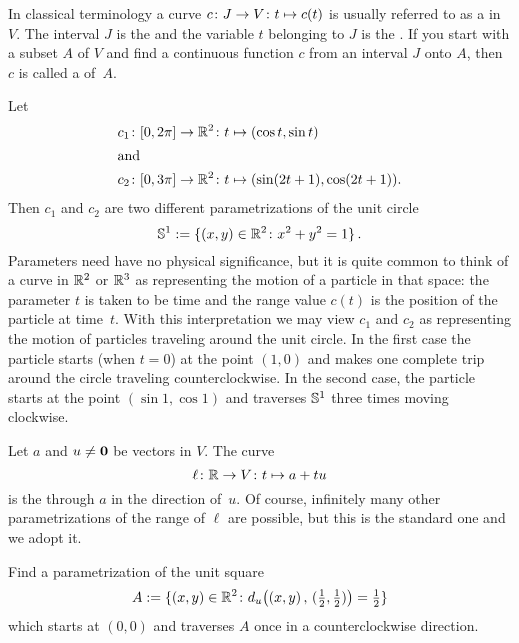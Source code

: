 In classical terminology a curve $c \colon J \rightarrow V \colon t \mapsto c(t)$ is usually referred
to as a
 in~$V$.  The interval $J$ is the
 and the variable $t$ belonging to $J$ is the
.  If you start with a subset $A$ of $V$ and find a continuous function $c$ from
an interval $J$ onto $A$, then $c$ is called a
 of~$A$.

\begin{exam}  Let
 \begin{align*}
      c_1 &\colon [0,2\pi] \rightarrow \mathbb{R}^2 \colon t \mapsto (\cos t,\sin t) \\
   \intertext{and}
      c_2 &\colon [0,3\pi] \rightarrow \mathbb{R}^2 \colon t \mapsto (\sin(2t + 1), \cos(2t + 1)).
 \end{align*}
Then $c_1$ and $c_2$ are two different parametrizations of the unit circle
  \[ \mathbb{S}^1 := \{(x,y) \in \mathbb{R}^2 \colon x^2 + y^2 = 1\}\,. \]
Parameters need have no physical significance, but it is quite common to think of a curve in
$\mathbb{R}^2$ or $\mathbb{R}^3$ as representing the motion of a particle in that  space: the parameter $t$ is
taken to be time and the range value $c(t)$ is the position of the particle at time~$t$.  With
this interpretation we may view $c_1$ and $c_2$ as representing the motion of particles
traveling around the unit circle.  In the first case the particle starts (when $t=0$) at the
point $(1,0)$ and makes one complete trip around the circle traveling counterclockwise.  In
the second case, the particle starts at the point $(\sin 1,\cos 1)$ and traverses $\mathbb{S}^1$
three times moving clockwise.
\end{exam}

\begin{exam}  Let $a$ and $u \ne \mathbf{0}$ be vectors in $V$. The curve
  \[ \ell\colon \mathbb{R} \rightarrow V\colon t \mapsto a + tu \]
is the
 through $a$ in the direction of~$u$.  Of course, infinitely many other
parametrizations of the range of $\ell$ are possible, but this is the standard one and we
adopt it.
\end{exam}

\begin{prob}  Find a parametrization of the unit square
  \[ A := \{(x,y) \in \mathbb{R}^2\colon  d_u\bigl((x,y)\, , \,({\tfrac12},
                       {\tfrac12}) \bigr) = {\tfrac12}\}\]
which starts at $(0,0)$ and traverses $A$ once in a counterclockwise direction.
\end{prob}

